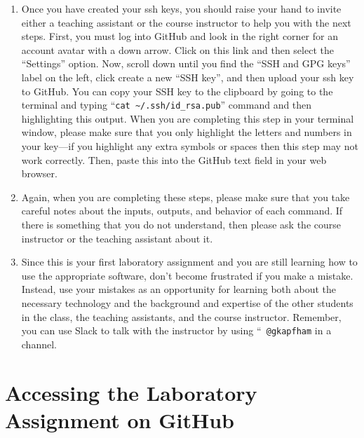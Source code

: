 \documentclass[11pt]{article}
\begin{document}
\begin{enumerate}
  \item Once you have created your ssh keys, you should raise your hand to invite either a teaching assistant or the
    course instructor to help you with the next steps. First, you must log into GitHub and look in the right corner for
    an account avatar with a down arrow. Click on this link and then select the ``Settings'' option. Now, scroll down
    until you find the ``SSH and GPG keys'' label on the left, click create a new ``SSH key'', and then upload your ssh
    key to GitHub. You can copy your SSH key to the clipboard by going to the terminal and typing ``{\tt cat
    \textasciitilde{}/.ssh/id\_rsa.pub}'' command and then highlighting this output. When you are completing this step
    in your terminal window, please make sure that you only highlight the letters and numbers in your key---if you
    highlight any extra symbols or spaces then this step may not work correctly. Then, paste this into the GitHub text
    field in your web browser.

  \item Again, when you are completing these steps, please make sure that you take careful notes about the inputs,
    outputs, and behavior of each command. If there is something that you do not understand, then please ask the course
    instructor or the teaching assistant about it.

  \item Since this is your first laboratory assignment and you are still learning how to use the appropriate software,
    don't become frustrated if you make a mistake. Instead, use your mistakes as an opportunity for learning both about
    the necessary technology and the background and expertise of the other students in the class, the teaching
    assistants, and the course instructor. Remember, you can use Slack to talk with the instructor by using ``{\tt
    @gkapfham} in a channel.

\end{enumerate}

\section*{Accessing the Laboratory Assignment on GitHub}
\end{document}
